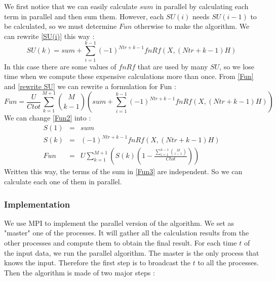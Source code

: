 \documentclass[11pt,a4paper]{article}
\begin{document}
We first notice that we can easily calculate $sum$ in parallel by calculating each term in parallel and then sum them. However, each $SU(i)$ needs $SU(i-1)$ to be calculated, so we must determine $Fun$ otherwise to make the algorithm.
We can rewrite \eqref{SU(i)} this way :
\begin{equation}
	SU(k) = sum + \sum_{i=1}^{k-1} (-1)^{Ntr+k-1}fnRf(X,(Ntr + k-1)H)
	\label{rewrite SU}
\end{equation}
In this case there are some values of $fnRf$ that are used by many $SU$, so we lose time when we compute these expensive calculations more than once.
From \eqref{Fun} and \eqref{rewrite SU} we can rewrite a formulation for Fun :
\begin{equation}
	Fun =\displaystyle{ \frac{U}{Ctot}  \sum_{k=1}^{M+1} \binom{M}{k-1}\left(sum + \sum_{i=1}^{k-1} (-1)^{Ntr+k-1}fnRf(X,(Ntr + k-1)H)\right)}
	\label{Fun2}
\end{equation}
We can change \eqref{Fun2} into :
\begin{eqnarray}
	S(1) &=& sum\\
	S(k) &=& (-1)^{Ntr+k-1}fnRf(X,(Ntr + k-1)H)\\
	Fun &=& \displaystyle{U \sum_{k=1}^{M+1}\left(S(k)(1-\frac{ \sum_{i=1}^{k-1} \binom{M}{i-1}}{Ctot})\right)} \label{Fun3}
\end{eqnarray}
Written this way, the terms of the sum in \eqref{Fun3} are independent. So we can calculate each one of them in parallel.

\subsubsection*{Implementation}

We use MPI to implement the parallel version of the algorithm. We set as "master" one of the processes. It will gather all the calculation results from the other processes and compute them to obtain the final result. For each time $t$ of the input data, we run the parallel algorithm. The master is the only process that knows the input. Therefore the first step is to broadcast the $t$ to all the processes. Then the algorithm is made of two major steps :
\end{document}
